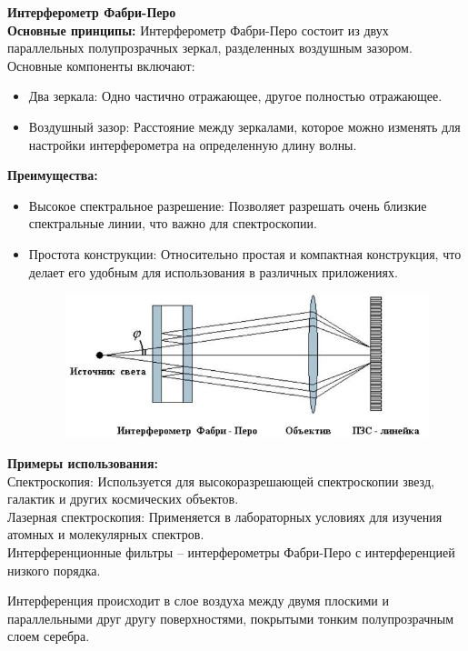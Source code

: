 \documentclass[12pt]{article}
\begin{document}
	\textbf{Интерферометр Фабри-Перо}\\
	\textbf{Основные принципы:}
	Интерферометр Фабри-Перо состоит из двух параллельных полупрозрачных зеркал, разделенных воздушным зазором. Основные компоненты включают:
	\begin{itemize}
	
\item	Два зеркала: Одно частично отражающее, другое полностью отражающее.
	\item Воздушный зазор: Расстояние между зеркалами, которое можно изменять для настройки интерферометра на определенную длину волны.\\ 
\end{itemize}
	\textbf{Преимущества:}
	\begin{itemize}
\item	Высокое спектральное разрешение: Позволяет разрешать очень близкие спектральные линии, что важно для спектроскопии.
\item	Простота конструкции: Относительно простая и компактная конструкция, что делает его удобным для использования в различных приложениях.
\begin{figure}[h]
	\centering
	\includegraphics[width=0.7\linewidth]{image029}
\end{figure}


	
\end{itemize}
	\textbf{Примеры использования:}\\
	
	Спектроскопия: Используется для высокоразрешающей спектроскопии звезд, галактик и других космических объектов.\\
	Лазерная спектроскопия: Применяется в лабораторных условиях для изучения атомных и молекулярных спектров.\\
	
	Интерференционные фильтры -- интерферометры Фабри-Перо с
	интерференцией низкого порядка.
	
	Интерференция происходит в слое
	воздуха между двумя плоскими и
	параллельными друг другу
	поверхностями, покрытыми тонким
	полупрозрачным слоем
	серебра.
	
\end{document}
